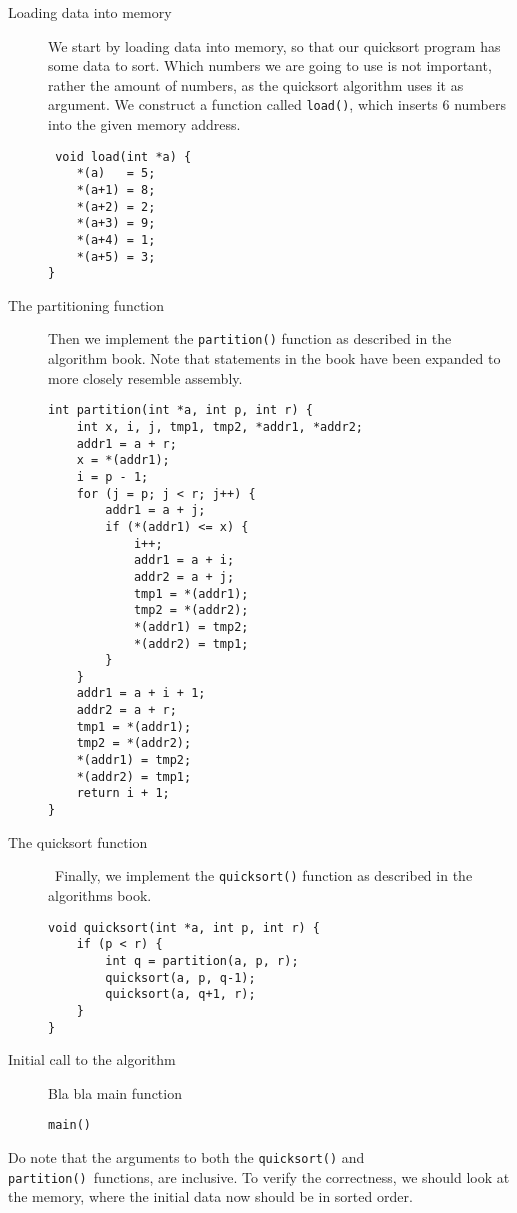 \begin{description}
    \item[Loading data into memory] We start by loading data into memory, so
        that our quicksort program has some data to sort. Which numbers we are
        going to use is not important, rather the amount of numbers, as the
        quicksort algorithm uses it as argument. We construct a function
        called \texttt{load()}, which inserts 6 numbers into the given memory
        address.
        \begin{lstlisting}
 void load(int *a) {
    *(a)   = 5;
    *(a+1) = 8;
    *(a+2) = 2;
    *(a+3) = 9;
    *(a+4) = 1;
    *(a+5) = 3;
}\end{lstlisting}

    \item[The partitioning function] Then we implement the \texttt{partition()}
        function as described in the algorithm book\cite{ref:alg}. Note that
        statements in the book have been expanded to more closely resemble
        assembly.
\begin{lstlisting}
int partition(int *a, int p, int r) {
    int x, i, j, tmp1, tmp2, *addr1, *addr2;
    addr1 = a + r;
    x = *(addr1);
    i = p - 1;
    for (j = p; j < r; j++) {
        addr1 = a + j;
        if (*(addr1) <= x) {
            i++;
            addr1 = a + i;
            addr2 = a + j;
            tmp1 = *(addr1);
            tmp2 = *(addr2);
            *(addr1) = tmp2;
            *(addr2) = tmp1;
        }
    }
    addr1 = a + i + 1;
    addr2 = a + r;
    tmp1 = *(addr1);
    tmp2 = *(addr2);
    *(addr1) = tmp2;
    *(addr2) = tmp1;
    return i + 1;
}
\end{lstlisting}

    \item[The quicksort function] Finally, we implement the
        \texttt{quicksort()} function as described in the algorithms book.
\begin{lstlisting}
void quicksort(int *a, int p, int r) {
    if (p < r) {
        int q = partition(a, p, r);
        quicksort(a, p, q-1);
        quicksort(a, q+1, r);
    }
}
\end{lstlisting}

    \item[Initial call to the algorithm] Bla bla main function
\begin{lstlisting}
main()
\end{lstlisting}
\end{description}
Do note that the arguments to both the \texttt{quicksort()} and
\texttt{partition()} functions, are inclusive. To verify the correctness, we
should look at the memory, where the initial data now should be in sorted
order.

